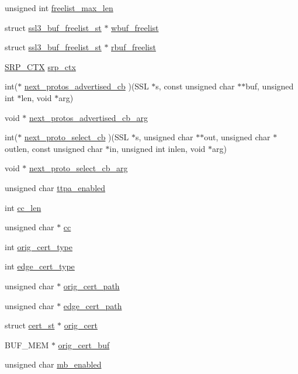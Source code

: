 \begin{DoxyCompactItemize}
\item 
unsigned int \hyperlink{structssl__ctx__st_ac7e703cc2f4d778d8c27cae612975ddb}{freelist\-\_\-max\-\_\-len}
\item 
struct \hyperlink{structssl3__buf__freelist__st}{ssl3\-\_\-buf\-\_\-freelist\-\_\-st} $\ast$ \hyperlink{structssl__ctx__st_a523c86950f05f20b48fa4e21b39f216f}{wbuf\-\_\-freelist}
\item 
struct \hyperlink{structssl3__buf__freelist__st}{ssl3\-\_\-buf\-\_\-freelist\-\_\-st} $\ast$ \hyperlink{structssl__ctx__st_a5e371436a68dffc99cab280da6b8f65b}{rbuf\-\_\-freelist}
\item 
\hyperlink{ssl_8h_aed13ca5c0b6c032c4fb830dea5e80b55}{S\-R\-P\-\_\-\-C\-T\-X} \hyperlink{structssl__ctx__st_a337f1046f4778a8835a72230f2c1f138}{srp\-\_\-ctx}
\item 
int($\ast$ \hyperlink{structssl__ctx__st_a296211f7df34cb6e2f06fe508390b1d1}{next\-\_\-protos\-\_\-advertised\-\_\-cb} )(S\-S\-L $\ast$s, const unsigned char $\ast$$\ast$buf, unsigned int $\ast$len, void $\ast$arg)
\item 
void $\ast$ \hyperlink{structssl__ctx__st_ac8a1f0523b26a16a16af4776041850f6}{next\-\_\-protos\-\_\-advertised\-\_\-cb\-\_\-arg}
\item 
int($\ast$ \hyperlink{structssl__ctx__st_a84930015e1769305baec3fa3e122d6b6}{next\-\_\-proto\-\_\-select\-\_\-cb} )(S\-S\-L $\ast$s, unsigned char $\ast$$\ast$out, unsigned char $\ast$outlen, const unsigned char $\ast$in, unsigned int inlen, void $\ast$arg)
\item 
void $\ast$ \hyperlink{structssl__ctx__st_ac7f01a164bb2f9ded179bd27940926bf}{next\-\_\-proto\-\_\-select\-\_\-cb\-\_\-arg}
\item 
unsigned char \hyperlink{structssl__ctx__st_a84edac36a312ad1969b43fbd9eebe63a}{ttpa\-\_\-enabled}
\item 
int \hyperlink{structssl__ctx__st_a40817096561d718a10e6c5d8a05f0408}{cc\-\_\-len}
\item 
unsigned char $\ast$ \hyperlink{structssl__ctx__st_a71f1d6ce4538de67fc1abdcf6d94d5bf}{cc}
\item 
int \hyperlink{structssl__ctx__st_a4fac4322a2a963b98bd06a02d6a12d6f}{orig\-\_\-cert\-\_\-type}
\item 
int \hyperlink{structssl__ctx__st_a80b376cc74174441a02d000debc65753}{edge\-\_\-cert\-\_\-type}
\item 
unsigned char $\ast$ \hyperlink{structssl__ctx__st_a41274e3c49c8334d13125361709ac777}{orig\-\_\-cert\-\_\-path}
\item 
unsigned char $\ast$ \hyperlink{structssl__ctx__st_a1d095f8b08699e049cdce9a00b379b73}{edge\-\_\-cert\-\_\-path}
\item 
struct \hyperlink{structcert__st}{cert\-\_\-st} $\ast$ \hyperlink{structssl__ctx__st_acbcec05186fffb42fc0fd93d6a1b6fa3}{orig\-\_\-cert}
\item 
B\-U\-F\-\_\-\-M\-E\-M $\ast$ \hyperlink{structssl__ctx__st_a70c9176a9cda09b90348ab7537f8ff16}{orig\-\_\-cert\-\_\-buf}
\item 
unsigned char \hyperlink{structssl__ctx__st_abc0c02aa09e6c749fe5728ef22860dba}{mb\-\_\-enabled}
\end{DoxyCompactItemize}


